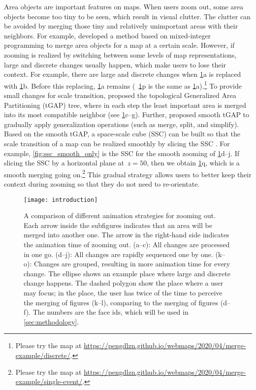 \documentclass[ijgi,article,submit,moreauthors,pdftex]{Definitions/mdpi}
\begin{document}
Area objects are important features on maps. 
When users zoom out,
some area objects become too tiny to be seen,
which result in visual clutter.
The clutter can be avoided by merging 
those tiny and relatively unimportant areas with their neighbors.
For example, \citet{haunert2008f} developed a method based on
mixed-integer programming to merge area objects
for a map at a certain scale.
However, if zooming is realized by switching between
some levels of map representations, 
large and discrete changes usually happen, 
which make users to lose their context.
For example, there are large and discrete changes when
\fig\ref{fig:intro}a is replaced with \fig\ref{fig:intro}b.
Before this replacing, \fig\ref{fig:intro}a remains
(\eg~\fig\ref{fig:intro}p is the same as \fig\ref{fig:intro}a).\footnote{%
Please try the map at
\url{https://pengdlzn.github.io/webmaps/2020/04/merge-example/discrete/}.}
To provide small changes for scale transition, 
\citet{vanOosterom2005} proposed 
the topological Generalized Area Partitioning (tGAP) tree,
where in each step the least important area is merged into
its most compatible neighbor 
(see \figs\ref{fig:intro}c--g).
Further, \citet{vanOosterom2014Support} proposed smooth tGAP
to gradually apply generalization operations 
(such as merge, split, and simplify).
Based on the smooth tGAP, a space-scale cube (SSC) can be built so that 
the scale transition of a map can be realized smoothly
by slicing the SSC \citep[see][]{Meijers2020Web}.
For example, \fig\ref{fig:ssc_smooth_only} is the SSC 
for the smooth zooming of \figs\ref{fig:intro}d--j.
If slicing the SSC by a horizontal plane at~$z=50$,
then we obtain \fig\ref{fig:intro}q, 
which is a smooth merging going on.\footnote{%
Please try the map at
\url{https://pengdlzn.github.io/webmaps/2020/04/merge-example/single-event/}.}
This gradual strategy allows users 
to better keep their context during zooming
so that they do not need to re-orientate.


\begin{figure}[tb]
\centering
\texttt{[image: introduction]}
\caption{A comparison of different animation strategies for zooming out.
Each arrow inside the subfigures indicates that 
an area will be merged into another one.
The arrow in the right-hand side indicates the animation time of zooming out.
%
(a--c): All changes are processed in one go.
(d--j): All changes are rapidly sequenced one by one.
(k--o): Changes are grouped, resulting in more animation time for every change.
%
The ellipse shows an example place where large and discrete change happens.
The dashed polygon show the place where a user may focus;
in the place, the user has twice of the time to perceive the merging
of figures (k--l),
comparing to the merging of figures (d--f).
The numbers are the face ids, which will be used in \sect\ref{sec:methodology}.
}
\label{fig:intro}
\end{figure}
\end{document}
